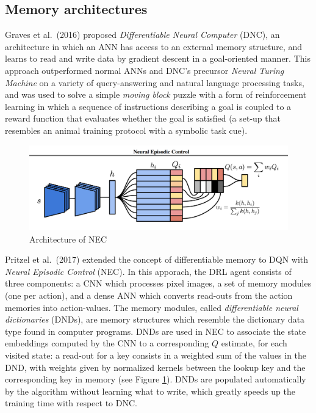 \subsection{Memory architectures}
Graves et al.\ (2016) \cite{graves2016hybrid} proposed \textit{Differentiable 
Neural Computer} (DNC), an architecture in which an ANN has access to an 
external memory structure, and learns to read and write data by gradient descent
in a goal-oriented manner.
This approach outperformed normal ANNs and DNC's precursor \textit{Neural 
Turing Machine} \cite{gravesneural} on a variety of query-answering and natural 
language processing tasks, and was used to solve a simple \textit{moving block} 
puzzle with a form of reinforcement learning in which a sequence of instructions
describing a goal is coupled to a reward function that evaluates whether the 
goal is satisfied (a set-up that resembles an animal training protocol with a 
symbolic task cue).
%
\begin{figure}[h]
\includegraphics[width=\textwidth]{pictures/nec}
\centering
\caption{Architecture of NEC}
\label{f:nec}
\end{figure}
%

Pritzel et al.\ (2017) \cite{pritzel2017neural} extended the concept of 
differentiable memory to DQN with \textit{Neural Episodic Control} (NEC). 
In this apporach, the DRL agent consists of three components: a CNN which 
processes pixel images, a set of memory modules (one per action), and a dense 
ANN which converts read-outs from the action memories into action-values. The 
memory modules, called \textit{differentiable neural dictionaries} (DNDs), are 
memory structures which resemble the dictionary data type found in computer 
programs. DNDs are used in NEC to associate the state embeddings computed by the
CNN to a corresponding $Q$ estimate, for each visited state: a read-out for a 
key consists in a weighted sum of the values in the DND, with weights given by 
normalized kernels between the lookup key and the corresponding key in memory 
(see Figure \ref{f:nec}). 
DNDs are populated automatically by the algorithm without learning what to write,
which greatly speeds up the training time with respect to DNC.

